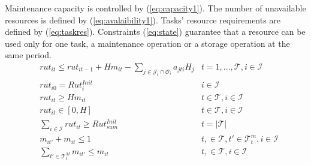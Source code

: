 \documentclass[a4paper,onecolumn,fleqn]{article}
\begin{document}
    Maintenance capacity is controlled by (\ref{eq:capacity1}). The number of unavailable resources is defined by (\ref{eq:avalaibility1}). Tasks' resource requirements are defined by (\ref{eq:taskres}). Constraints (\ref{eq:state}) guarantee that a resource can be used only for one task, a maintenance operation or a storage operation at the same period.  
    \begin{align}
         & rut_{it} \leq rut_{it-1} + H m_{it} - \sum_{j \in \mathcal{J}_t \cap \mathcal{O}_i} a_{jti} H_j & t =1, ..., \mathcal{T}, i \in \mathcal{I} \label{eq:rut_upper}\\
        & rut_{i0} = Rut^{Init}_i
               & i \in \mathcal{I} \label{eq:rut_initial}\\
        & rut_{it} \geq H m_{it}
                & t \in \mathcal{T}, i \in \mathcal{I}\label{eq:rut_lower}\\ 
        & rut_{it} \in [0,H]
                & t \in \mathcal{T}, i \in \mathcal{I} \label{eq:mu} \\               
        & \sum_{i \in \mathcal{I}} rut_{it} \geq Rut^{Init}_{sum}
              & t = |\mathcal{T}| \label{eq:min_rut} \\
        & m_{it'} + m_{it} \leq 1
          & t, \in \mathcal{T}, t' \in \mathcal{T}^{m}_t, i \in \mathcal{I}\label{eq:ret_min}\\ 
        & \sum_{t' \in \mathcal{T}^{M}_t} m_{it'} \leq  m_{it}
          & t, \in \mathcal{T}, i \in \mathcal{I}\label{eq:ret_max}\\ 
    \end{align}

\end{document}
